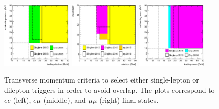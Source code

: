 \begin{figure}[htpb]
    \centering
        \includegraphics[width=0.3\textwidth]{./figures/event_selection/triggers_ee.eps}
        \includegraphics[width=0.3\textwidth]{./figures/event_selection/triggers_emu.eps}
        \includegraphics[width=0.3\textwidth]{./figures/event_selection/triggers_mumu.eps}
        \caption{Transverse momentum criteria to select either single-lepton or dilepton triggers in order to avoid overlap.
        The plots correspond to $ee$ (left), $e\mu$ (middle), and $\mu\mu$ (right) final states.~\cite{TauConfNote}}\label{fig:event_selection:triggers}
\end{figure}

